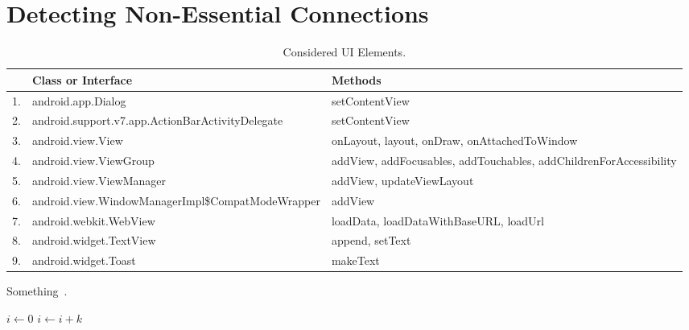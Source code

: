\section{Detecting Non-Essential Connections}
\label{sec:analysis}

\begin{table}[t]
\renewcommand*{\arraystretch}{1.3}
\caption{Considered UI Elements.}
\label{tbl:ui}
\centering
\tabcolsep=1.5pt
\begin{tabular}{|l|P{3.5cm}|P{3.8cm}|}
\hline
& \textbf{Class or Interface} & \textbf{Methods} \\
. & android.app.Dialog                                 & setContentView \\
2. & android.support.v7.app.\newline{}ActionBarActivityDelegate   & setContentView \\
3. & android.view.View                                  & onLayout, layout, onDraw, onAttachedToWindow \\
4. & android.view.ViewGroup                             & addView, addFocusables, addTouchables, addChildrenForAccessibility \\
5. & android.view.ViewManager                           & addView, updateViewLayout \\
6. & android.view.\newline{}WindowManagerImpl\newline{}\$CompatModeWrapper  & addView \\
7. & android.webkit.WebView                             & loadData, loadDataWithBaseURL, loadUrl \\
8. & android.widget.TextView       & append, setText \\
9. & android.widget.Toast        & makeText \\
\hline
\end{tabular}
\end{table}

Something~\cite{Fu2007}.

\begin{algorithmic}[1]
    \State $i\gets 0$
\Else
        \State $i\gets i+k$
    \EndIf
\EndIf
\end{algorithmic}
